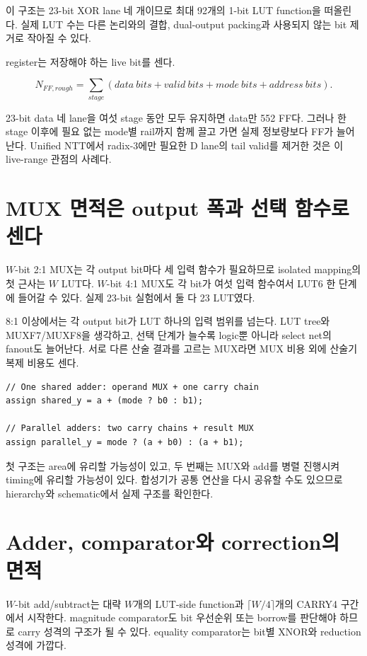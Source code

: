 이 구조는 23-bit XOR lane 네 개이므로 최대 92개의 1-bit LUT function을
떠올린다. 실제 LUT 수는 다른 논리와의 결합, dual-output packing과 사용되지 않는
bit 제거로 작아질 수 있다.

register는 저장해야 하는 live bit를 센다.

\[
N_{FF,rough}=\sum_{stage} (data\ bits+valid\ bits+mode\ bits+address\ bits).
\]

23-bit data 네 lane을 여섯 stage 동안 모두 유지하면 data만 552 FF다. 그러나
한 stage 이후에 필요 없는 mode별 rail까지 함께 끌고 가면 실제 정보량보다 FF가
늘어난다. Unified NTT에서 radix-3에만 필요한 D lane의 tail valid를 제거한 것은
이 live-range 관점의 사례다.

\section{MUX 면적은 output 폭과 선택 함수로 센다}

$W$-bit 2:1 MUX는 각 output bit마다 세 입력 함수가 필요하므로 isolated mapping의
첫 근사는 $W$ LUT다. $W$-bit 4:1 MUX도 각 bit가 여섯 입력 함수여서 LUT6 한
단계에 들어갈 수 있다. 실제 23-bit 실험에서 둘 다 23 LUT였다.

8:1 이상에서는 각 output bit가 LUT 하나의 입력 범위를 넘는다. LUT tree와
MUXF7/MUXF8을 생각하고, 선택 단계가 늘수록 logic뿐 아니라 select net의 fanout도
늘어난다. 서로 다른 산술 결과를 고르는 MUX라면 MUX 비용 외에 산술기 복제 비용도
센다.

\begin{lstlisting}
// One shared adder: operand MUX + one carry chain
assign shared_y = a + (mode ? b0 : b1);

// Parallel adders: two carry chains + result MUX
assign parallel_y = mode ? (a + b0) : (a + b1);
\end{lstlisting}

첫 구조는 area에 유리할 가능성이 있고, 두 번째는 MUX와 add를 병렬 진행시켜
timing에 유리할 가능성이 있다. 합성기가 공통 연산을 다시 공유할 수도 있으므로
hierarchy와 schematic에서 실제 구조를 확인한다.

\section{Adder, comparator와 correction의 면적}

$W$-bit add/subtract는 대략 $W$개의 LUT-side function과 $\lceil W/4\rceil$개의
CARRY4 구간에서 시작한다. magnitude comparator도 bit 우선순위 또는 borrow를
판단해야 하므로 carry 성격의 구조가 될 수 있다. equality comparator는 bit별
XNOR와 reduction 성격에 가깝다.

